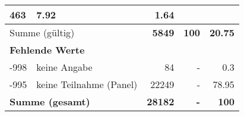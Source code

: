 \begin{longtable}{lXrrr}
       \num{463} &
       \num[round-mode=places,round-precision=2]{7.92} &
         \num[round-mode=places,round-precision=2]{1.64} \\
     \midrule
     \multicolumn{2}{l}{Summe (gültig)} &
       \textbf{\num{5849}} &
     \textbf{100} &
       \textbf{\num[round-mode=places,round-precision=2]{20.75}} \\
     \multicolumn{5}{l}{\textbf{Fehlende Werte}}\\
       -998 &
       keine Angabe &
         \num{84} &
        - &
         \num[round-mode=places,round-precision=2]{0.3} \\
       -995 &
       keine Teilnahme (Panel) &
         \num{22249} &
        - &
         \num[round-mode=places,round-precision=2]{78.95} \\
     \midrule
     \multicolumn{2}{l}{\textbf{Summe (gesamt)}} &
          \textbf{\num{28182}} &
        \textbf{-} &
        \textbf{100} \\
     \bottomrule
     \end{longtable}
     
